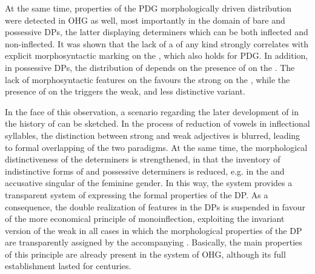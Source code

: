 \documentclass[output=paper,colorlinks,citecolor=brown]{langscibook}
\begin{document}
At the same time, properties of the PDG morphologically driven
distribution were detected in OHG as well, most importantly in the
domain of bare and possessive DPs, the latter displaying determiners
which can be both inflected and non-inflected. It was shown that the
lack of a  of any kind strongly correlates with explicit
morphosyntactic marking on the , which also holds for PDG. In
addition, in possessive DPs, the distribution of 
depends on the presence of  on the . The lack of
morphosyntactic features on the  favours the strong 
on the , while the presence of  on the 
triggers the weak, and less distinctive variant.

\begin{sloppypar}
In the face of this observation, a scenario regarding the later
development of  in the history of  can be
sketched. In the process of reduction of vowels in inflectional
syllables, the distinction between strong and weak adjectives is
blurred, leading to formal overlapping of the two paradigms. At the same
time, the morphological distinctiveness of the determiners is
strengthened, in that the inventory of indistinctive forms of 
and possessive determiners is reduced, e.g. in the  and
accusative singular of the feminine gender. In this way, the 
system provides a transparent system of expressing the formal properties
of the DP. As a consequence, the double realization of features in the
DPs is suspended in favour of the more economical principle of
monoinflection, exploiting the invariant version of the weak  in
all cases in which the morphological properties of the DP are
transparently assigned by the accompanying . Basically, the
main properties of this principle are already present in the system of
OHG, although its full establishment lasted for centuries.
\end{sloppypar}

 
\end{document}
